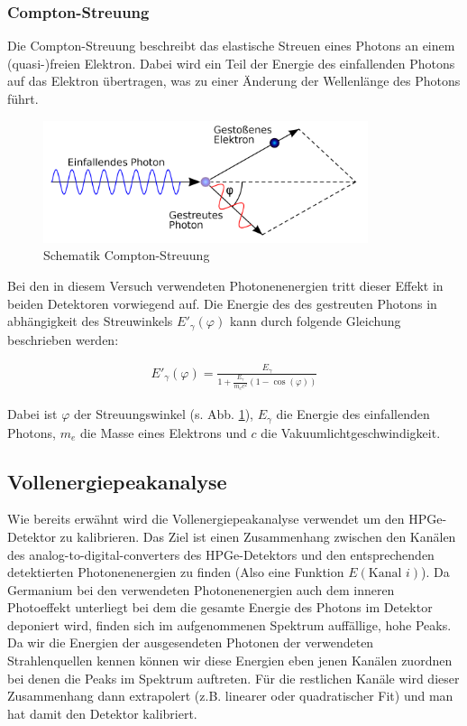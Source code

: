 \subsubsection{Compton-Streuung}

Die Compton-Streuung beschreibt das elastische Streuen eines Photons an einem (quasi-)freien Elektron. Dabei wird ein Teil der Energie des einfallenden Photons auf das Elektron übertragen, was zu einer Änderung der Wellenlänge des Photons führt.

\begin{figure}[ht]
	\centering
    \includegraphics[width=0.85\textwidth]{images/The-geometry-of-Compton-scattering-showing-the-directions-of-the-scattered-photon-and.png}
	\caption{Schematik Compton-Streuung \cite{Bild_Compton_Streuung}}
	\label{theorie_Compton_Streuuung}
\end{figure}

Bei den in diesem Versuch verwendeten Photonenenergien tritt dieser Effekt in beiden Detektoren vorwiegend auf.
Die Energie des des gestreuten Photons in abhängigkeit des Streuwinkels $E'_{\gamma}(\varphi)$ kann durch folgende Gleichung beschrieben werden:

\begin{gather}
    E'_{\gamma}(\varphi) = \frac{E_{\gamma}}{1 + \frac{E_{\gamma}}{m_{e} c^{2}} (1 - \cos (\varphi))}
\end{gather}

Dabei ist $\varphi$ der Streuungswinkel (s. Abb. \ref{theorie_Compton_Streuuung}), $E_{\gamma}$ die Energie des einfallenden Photons, $m_{e}$ die Masse eines Elektrons und $c$ die Vakuumlichtgeschwindigkeit.

\subsection{Vollenergiepeakanalyse}

Wie bereits erwähnt wird die Vollenergiepeakanalyse verwendet um den HPGe-Detektor zu kalibrieren. Das Ziel ist einen Zusammenhang zwischen den Kanälen des analog-to-digital-converters des HPGe-Detektors und den entsprechenden detektierten Photonenenergien zu finden (Also eine Funktion $E(\text{Kanal } i)$). Da Germanium bei den verwendeten Photonenenergien auch dem inneren Photoeffekt unterliegt bei dem die gesamte Energie des Photons im Detektor deponiert wird, finden sich im aufgenommenen Spektrum auffällige, hohe Peaks. Da wir die Energien der ausgesendeten Photonen der verwendeten Strahlenquellen kennen können wir diese Energien eben jenen Kanälen zuordnen bei denen die Peaks im Spektrum auftreten. Für die restlichen Kanäle wird dieser Zusammenhang dann extrapolert (z.B. linearer oder quadratischer Fit) und man hat damit den Detektor kalibriert.

